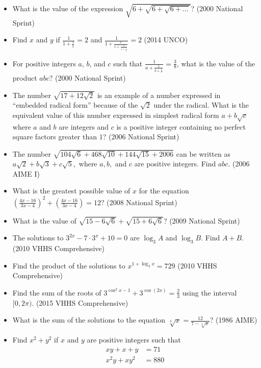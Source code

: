 \documentclass{article}
\begin{document}
\begin{itemize}
\item What is the value of the expression $\sqrt{6+\sqrt{6+\sqrt{6+\ldots}}}$? (2000 National Sprint)

%
\item Find $x$ and $y$ if $\frac{1}{1+\frac{1}{x}}=2$ and $\frac{1}{1+\frac{1}{1+\frac{1}{1+\frac{1}{y}}}}=2$ (2014 UNCO)

\item For positive integers $a$, $b$, and $c$ such that $\frac{1}{a+\frac{1}{b+\frac{1}{c}}}=\frac{3}{8}$, what is the value of the product $abc$? (2000 National Sprint)

\item The number $\sqrt{17+12\sqrt{2}}$ is an example of a number expressed in ``embedded radical form'' because of the $\sqrt{2}$ under the radical. What is the equivalent value of this number expressed in simplest radical form $a+b\sqrt{c}$ where $a$ and $b$ are integers and $c$ is a positive integer containing no perfect square factors greater than $1$? (2006 National Sprint)

\item The number $ \sqrt{104\sqrt{6}+468\sqrt{10}+144\sqrt{15}+2006}$ can be written as $ a\sqrt{2}+b\sqrt{3}+c\sqrt{5}, $ where $ a, b, $ and $ c $ are positive integers. Find $abc$. (2006 AIME I)

\item What is the greatest possible value of $x$ for the equation $\left(\frac{4x-16}{3x-4}\right)^2+\left(\frac{4x-16}{3x-4}\right)=12$? (2008 National Sprint)

\item What is the value of $\sqrt{15-6\sqrt{6}}+\sqrt{15+6\sqrt{6}}$? (2009 National Sprint)

%
\item The solutions to $3^{2x}-7\cdot 3^x+10=0$ are $\log_3A$ and $\log_3B$. Find $A+B$. (2010 VHHS Comprehensive)

%
\item Find the product of the solutions to $x^{1+\log_3x}=729$ (2010 VHHS Comprehensive)

\item Find the sum of the roots of $3^{\cos^2x-1}+3^{\cos(2x)}=\frac{2}{3}$ using the interval $[0,2\pi)$. (2015 VHHS Comprehensive)

\item What is the sum of the solutions to the equation $\sqrt[4]{x}=\frac{12}{7-\sqrt[4]{x}}$? (1986 AIME)

\item Find $x^2+y^2$ if $x$ and $y$ are positive integers such that 
\begin{align*}
xy+x+y &=71 \\
x^2y+xy^2 &= 880
\end{align*}

% 
\end{itemize}
\end{document}
